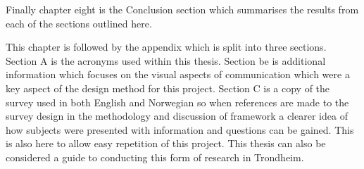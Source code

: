 Finally chapter eight is the Conclusion section which summarises the results from each of the sections outlined here.

This chapter is followed by the appendix which is split into three sections. Section A is the acronyms used within this thesis. Section be is additional information which focuses on the visual aspects of communication which were a key aspect of the design method for this project. Section C is a copy of the survey used in both English and Norwegian so when references are made to the survey design in the methodology and  discussion of framework a clearer idea of how subjects were presented with information and questions can be gained. This is also here to allow easy repetition of this project. This thesis can also be considered a guide to conducting this form of research in Trondheim. 
